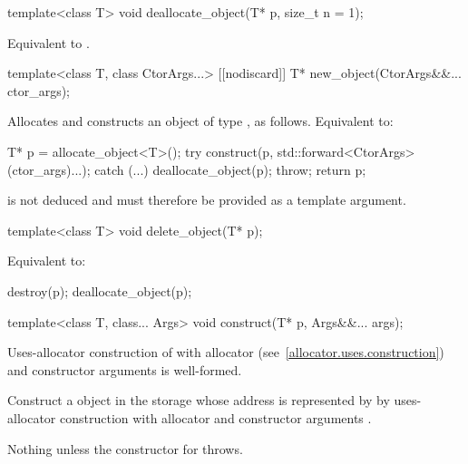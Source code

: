 %
\begin{itemdecl}
template<class T>
  void deallocate_object(T* p, size_t n = 1);
\end{itemdecl}

\begin{itemdescr}
\pnum
\effects
Equivalent to .
\end{itemdescr}

%
\begin{itemdecl}
template<class T, class CtorArgs...>
  [[nodiscard]] T* new_object(CtorArgs&&... ctor_args);
\end{itemdecl}

\begin{itemdescr}
\pnum
\effects
Allocates and constructs an object of type , as follows.\newline
Equivalent to:
\begin{codeblock}
T* p = allocate_object<T>();
try {
  construct(p, std::forward<CtorArgs>(ctor_args)...);
} catch (...) {
  deallocate_object(p);
  throw;
}
return p;
\end{codeblock}

\pnum
\begin{note}
 is not deduced and must therefore be provided as a template argument.
\end{note}
\end{itemdescr}

%
\begin{itemdecl}
template<class T>
  void delete_object(T* p);
\end{itemdecl}

\begin{itemdescr}
\pnum
\effects
Equivalent to:
\begin{codeblock}
destroy(p);
deallocate_object(p);
\end{codeblock}
\end{itemdescr}

%
\begin{itemdecl}
template<class T, class... Args>
  void construct(T* p, Args&&... args);
\end{itemdecl}

\begin{itemdescr}
\pnum
\mandates
Uses-allocator construction of 
with allocator  (see~\ref{allocator.uses.construction})
and constructor arguments  is well-formed.

\pnum
\effects
Construct a  object in the storage
whose address is represented by 
by uses-allocator construction with allocator 
and constructor arguments .

\pnum
\throws
Nothing unless the constructor for  throws.
\end{itemdescr}

